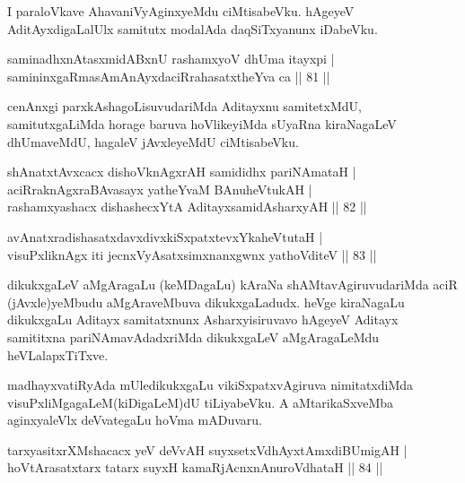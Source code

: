 \begin{artha}
I paraloVkave AhavaniVyAginxyeMdu ciMtisabeVku. hAgeyeV AditAyxdigaLalUlx samitutx modalAda daqSiTxyanunx iDabeVku.
\end{artha}

\begin{shl}
saminadhxnAtasxmidABxnU rashamxyoV dhUma itayxpi | \\
samininxgaRmasAmAnAyxdaciRrahasatxtheYva ca \hfill|| 81 || 
\end{shl}

\begin{artha}
cenAnxgi parxkAshagoLisuvudariMda Aditayxnu samitetxMdU, samitutxgaLiMda horage baruva hoVlikeyiMda sUyaRna kiraNagaLeV dhUmaveMdU, hagaleV jAvxleyeMdU ciMtisabeVku.
\end{artha}

\begin{shl}
shAnatxtAvxcacx dishoV\s knAgxrAH samididhx pariNAmataH | \\
aciRraknAgxraBAvasayx yatheYvaM BAnuheVtukAH | \\
rashamxyashacx dishashecxYtA AditayxsamidAsharxyAH \hfill|| 82 || 
\end{shl}

\begin{shl}
avAnatxradishasatxdavxdivxkiSxpatxtevxYkaheVtutaH | \\
visuPxliknAgx iti jecnxVyAsatxsimxnanxgwnx yathoVditeV \hfill|| 83 || 
\end{shl}

\begin{artha}
dikukxgaLeV aMgAragaLu (keMDagaLu) kAraNa shAMtavAgiruvudariMda aciR (jAvxle)yeMbudu aMgAraveMbuva dikukxgaLadudx. heVge kiraNagaLu dikukxgaLu Aditayx samitatxnunx Asharxyisiruvavo hAgeyeV Aditayx samititxna pariNAmavAdadxriMda dikukxgaLeV aMgAragaLeMdu heVLalapxTiTxve.

madhayxvatiRyAda mUledikukxgaLu vikiSxpatxvAgiruva nimitatxdiMda visuPxliMgagaLeM(kiDigaLeM)dU tiLiyabeVku. A aMtarikaSxveMba aginxyaleVlx deVvategaLu hoVma mADuvaru.
\end{artha}


\begin{shl}
\footnotemark[1]tarxyasitxrXMshacacx yeV deVvAH suyxsetxV\s dhAyxtAmxdiBUmigAH | \\
hoVtArasatxtarx tatarx suyxH kamaRjAcnxnAnuroVdhataH \hfill|| 84 || 
\end{shl}

